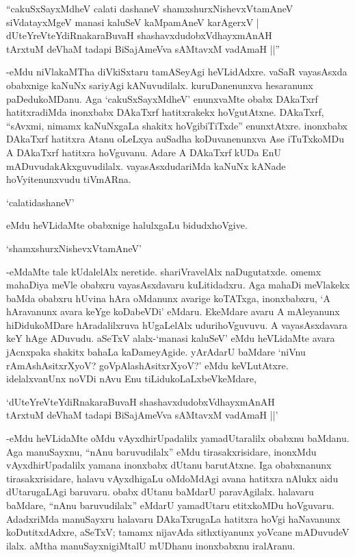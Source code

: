 \begin{shloka}
``cakuSxSayxMdheV calati dashaneV shamxshurxNishevxVtamAneV\\
siVdatayxMgeV manasi kaluSeV kaMpamAneV karAgerxV |\\
dUteYreVteYdiRnakaraBuvaH shashavxdudobxVdhayxmAnAH\\
tArxtuM deVhaM tadapi BiSajAmeVva sAMtavxM vadAmaH ||''
\end{shloka}

-eMdu niVlakaMTha diVkiSxtaru tamASeyAgi heVLidAdxre. {} vaSaR vayasAsxda obabxnige kaNuNx sariyAgi kANuvudilalx. kuruDanenunxva hesaranunx paDedukoMDanu. Aga `cakuSxSayxMdheV' enunxvaMte obabx DAkaTxrf hatitxradiMda inonxbabx DAkaTxrf hatitxrakekx hoVgutAtxne. DAkaTxrf, ``sAvxmi, nimamx kaNuNxgaLa shakitx hoVgibiTiTxde'' enunxtAtxre. inonxbabx DAkaTxrf hatitxra Atanu oLeLxya auSadha koDuvanenunxva Ase iTuTxkoMDu A DAkaTxrf hatitxra hoVguvanu. Adare A DAkaTxrf kUDa EnU mADuvudakAkxguvudilalx. vayasAsxdudariMda kaNuNx kANade hoVyitenunxvudu tiVmARna.

`calatidashaneV'

eMdu heVLidaMte obabxnige halulxgaLu bidudxhoVgive.

\begin{shloka}
`shamxshurxNishevxVtamAneV'
\end{shloka}

-eMdaMte tale kUdalelAlx neretide. shariVravelAlx naDugutatxde. omemx mahaDiya meVle obabxru vayasAsxdavaru kuLitidadxru. Aga mahaDi meVlakekx baMda obabxru hUvina hAra oMdanunx avarige koTATxga, inonxbabxru, `A hAravanunx avara keYge koDabeVDi' eMdaru. EkeMdare avaru A mAleyanunx hiDidukoMDare hAradalilxruva hUgaLelAlx udurihoVguvuvu. A vayasAsxdavara keY hAge ADuvudu. aSeTxV alalx-`manasi kaluSeV' eMdu heVLidaMte avara jAcnxpaka shakitx bahaLa kaDameyAgide. yArAdarU baMdare `niVnu rAmAshAsitxrXyoV? goVpAlashAsitxrXyoV?' eMdu keVLutAtxre. idelalxvanUnx noVDi nAvu Enu tiLidukoLaLxbeVkeMdare,

\begin{shloka}
`dUteYreVteYdiRnakaraBuvaH shashavxdudobxVdhayxmAnAH\\
tArxtuM deVhaM tadapi BiSajAmeVva sAMtavxM vadAmaH ||'
\end{shloka}

-eMdu heVLidaMte oMdu vAyxdhirUpadalilx yamadUtaralilx obabxnu baMdanu. Aga manuSayxnu, ``nAnu baruvudilalx'' eMdu tirasakxrisidare, inonxMdu vAyxdhirUpadalilx yamana inonxbabx dUtanu barutAtxne. Iga obabxnanunx tirasakxrisidare, halavu vAyxdhigaLu oMdoMdAgi avana hatitxra nAlukx aidu dUtarugaLAgi baruvaru. obabx dUtanu baMdarU paravAgilalx. halavaru baMdare, ``nAnu baruvudilalx'' eMdarU yamadUtaru etitxkoMDu hoVguvaru. AdadxriMda manuSayxru halavaru DAkaTxrugaLa hatitxra hoVgi haNavanunx koDutitxdAdxre, aSeTxV; tamamx nijavAda sithxtiyanunx yoVcane mADuvudeV ilalx. aMtha manuSayxnigiMtalU mUDhanu inonxbabxnu iralAranu.


